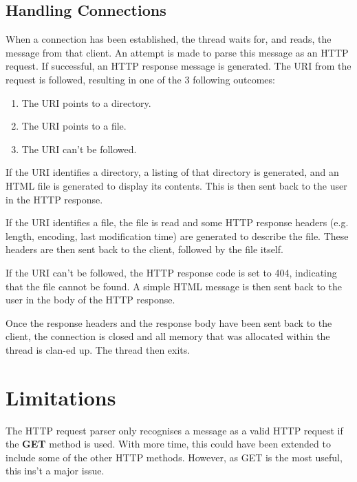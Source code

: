 \documentclass[a4paper]{article}
\begin{document}
\subsection{Handling Connections}
When a connection has been established, the thread waits for, and reads, the
message from that client. An attempt is made to parse this message as an HTTP
request. If successful, an HTTP response message is generated. The URI from the
request is followed, resulting in one of the 3 following outcomes:

\begin{enumerate}
\item The URI points to a directory.
\item The URI points to a file.
\item The URI can't be followed.
\end{enumerate}

If the URI identifies a directory, a listing of that directory is generated, and
an HTML file is generated to display its contents. This is then sent back to the
user in the HTTP response.

If the URI identifies a file, the file is read and some HTTP response headers
(e.g. length, encoding, last modification time) are generated to describe the
file. These headers are then sent back to the client, followed by the file
itself.

If the URI can't be followed, the HTTP response code is set to 404, indicating
that the file cannot be found. A simple HTML message is then sent back to the
user in the body of the HTTP response.

Once the response headers and the response body have been sent back to the
client, the connection is closed and all memory that was allocated within the
thread is clan-ed up. The thread then exits.

\section{Limitations}
The HTTP request parser only recognises a message as a valid HTTP request if the
{\bf GET} method is used. With more time, this could have been extended to
include some of the other HTTP methods. However, as GET is the most useful, this
ins't a major issue.
\end{document}
